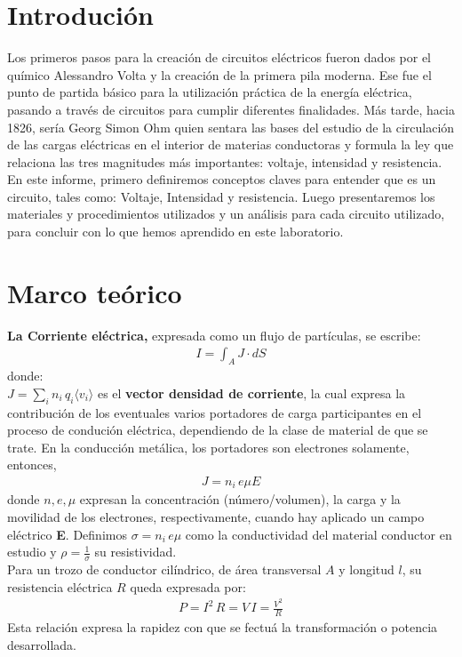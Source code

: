 \documentclass[]{article}
\begin{document}
\section{Introdución}
Los primeros pasos para la creación de circuitos eléctricos fueron dados por el químico Alessandro Volta y la creación de la primera pila moderna. Ese fue el punto de partida básico para la   utilización práctica de la energía eléctrica, pasando a través de circuitos para cumplir diferentes finalidades.
Más tarde, hacia 1826, sería Georg Simon Ohm quien sentara las bases del estudio de la circulación de las cargas eléctricas en el interior de materias conductoras y formula la ley que relaciona las tres magnitudes más importantes: voltaje, intensidad y resistencia.
En este informe, primero definiremos conceptos claves para entender que es un circuito, tales como: Voltaje, Intensidad y resistencia. Luego presentaremos los materiales y procedimientos utilizados y un análisis para cada circuito utilizado, para concluir con lo que hemos aprendido en este laboratorio.


\section{Marco teórico}

  \textbf{La Corriente eléctrica,} expresada como un flujo de partículas, se escribe:
  \begin{align*}
    I = \int_{A} J\cdot  dS
  \end{align*}
  donde: \\
    $J = \sum_{i} n_i \, q_i \langle v_i\rangle$ es el \textbf{vector densidad de corriente}, la cual expresa
    la contribución de los eventuales varios portadores de carga participantes en el proceso de condución eléctrica,
    dependiendo de la clase de material de que se trate. En la conducción metálica, los portadores son electrones solamente, entonces,
    \begin{align*}
      J = n_i \, e\mu E
    \end{align*} 
  donde $n, e, \mu$ expresan la concentración (número/volumen), la carga y la movilidad de los electrones, respectivamente,
  cuando hay aplicado un campo eléctrico \textbf{E}. Definimos $\sigma = n_i \, e\mu$ como la conductividad del material conductor en estudio y 
  $\rho = \frac{1}{\sigma}$ su resistividad. \\

  Para un trozo de conductor cilíndrico, de área transversal $A$ y longitud $l$, su resistencia eléctrica $R$ queda expresada
  por: 
  \begin{align*}
    P = I^2 \, R = V \, I = \frac{V^2}{R}
  \end{align*} 
  Esta relación expresa la rapidez con que se fectuá la transformación o potencia desarrollada. \\
  
\end{document}
